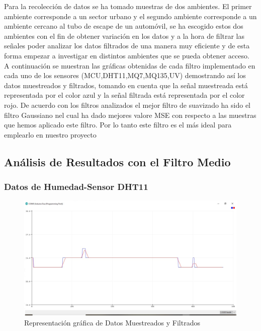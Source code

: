 \documentclass[10pt,a4paper]{article}
\begin{document}
\begin{multicols}{2}
\begin{itemize}
Para la recolección de datos se ha tomado muestras de dos ambientes. El primer ambiente corresponde a un sector urbano y el segundo ambiente corresponde a un ambiente cercano al tubo de escape de un automóvil, se ha escogido estos dos ambientes con el fin de obtener variación en los datos y a la hora de filtrar las señales poder analizar los datos filtrados de una manera muy eficiente y de esta forma empezar a investigar en distintos ambientes que se pueda obtener acceso.\\
A continuación se muestran las gráficas obtenidas de cada filtro implementado en cada uno de los sensores (MCU,DHT11,MQ7,MQ135,UV) demostrando así los datos muestreados y filtrados, tomando en cuenta que la señal  muestreada está representada por el color azul y la señal filtrada está representada por el color rojo.
De acuerdo con los filtros analizados el mejor filtro de suavizado ha sido el filtro  Gaussiano nel cual  ha dado mejores valore MSE con respecto a las muestras que hemos aplicado este filtro. Por lo tanto este filtro es el más ideal para emplearlo en nuestro proyecto


\subsection{Análisis de Resultados con el Filtro Medio}

\subsubsection{Datos de Humedad-Sensor DHT11}


\begin{figure}[H]
\centering
\includegraphics[scale=0.30]{dianohumedad.PNG}
\caption{Representación gráfica de Datos Muestreados y Filtrados}
\end{figure}



\end{itemize}
\end{multicols}
\end{document}
